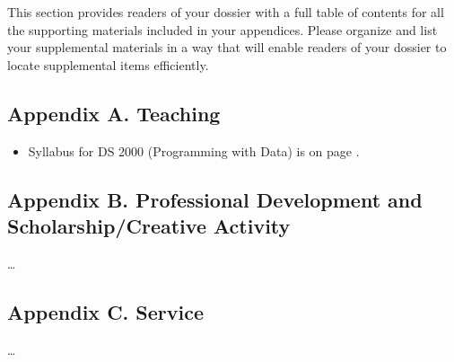 This section provides readers of your dossier with a full table of contents for all the supporting materials included in your appendices. 
Please organize and list your supplemental materials in a way that will enable readers of your dossier to locate supplemental items efficiently.

\subsection*{Appendix A. Teaching}
\begin{itemize}
    \item Syllabus for DS 2000 (Programming with Data) is on page \pageref{syllabus-ds2000}.
\end{itemize}

\subsection*{Appendix B. Professional Development and Scholarship/Creative Activity}
\ldots

\subsection*{Appendix C. Service}
\ldots

